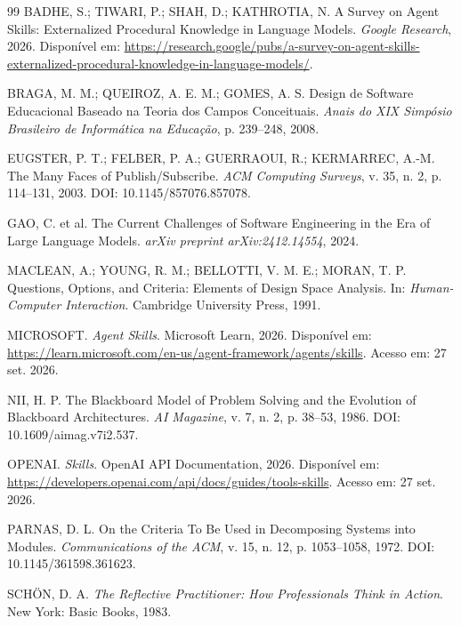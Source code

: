 \documentclass[preprint,12pt,authoryear]{elsarticle}
\begin{document}

\begin{thebibliography}{99}
BADHE, S.; TIWARI, P.; SHAH, D.; KATHROTIA, N. A Survey on Agent Skills: Externalized Procedural Knowledge in Language Models. \emph{Google Research}, 2026. Disponível em: \url{https://research.google/pubs/a-survey-on-agent-skills-externalized-procedural-knowledge-in-language-models/}.

BRAGA, M. M.; QUEIROZ, A. E. M.; GOMES, A. S. Design de Software Educacional Baseado na Teoria dos Campos Conceituais. \emph{Anais do XIX Simpósio Brasileiro de Informática na Educação}, p. 239--248, 2008.

EUGSTER, P. T.; FELBER, P. A.; GUERRAOUI, R.; KERMARREC, A.-M. The Many Faces of Publish/Subscribe. \emph{ACM Computing Surveys}, v. 35, n. 2, p. 114--131, 2003. DOI: 10.1145/857076.857078.

GAO, C. et al. The Current Challenges of Software Engineering in the Era of Large Language Models. \emph{arXiv preprint arXiv:2412.14554}, 2024.

MACLEAN, A.; YOUNG, R. M.; BELLOTTI, V. M. E.; MORAN, T. P. Questions, Options, and Criteria: Elements of Design Space Analysis. In: \emph{Human-Computer Interaction}. Cambridge University Press, 1991.

MICROSOFT. \emph{Agent Skills}. Microsoft Learn, 2026. Disponível em: \url{https://learn.microsoft.com/en-us/agent-framework/agents/skills}. Acesso em: 27 set. 2026.

NII, H. P. The Blackboard Model of Problem Solving and the Evolution of Blackboard Architectures. \emph{AI Magazine}, v. 7, n. 2, p. 38--53, 1986. DOI: 10.1609/aimag.v7i2.537.

OPENAI. \emph{Skills}. OpenAI API Documentation, 2026. Disponível em: \url{https://developers.openai.com/api/docs/guides/tools-skills}. Acesso em: 27 set. 2026.

PARNAS, D. L. On the Criteria To Be Used in Decomposing Systems into Modules. \emph{Communications of the ACM}, v. 15, n. 12, p. 1053--1058, 1972. DOI: 10.1145/361598.361623.

SCHÖN, D. A. \emph{The Reflective Practitioner: How Professionals Think in Action}. New York: Basic Books, 1983.


\end{thebibliography}
\end{document}
